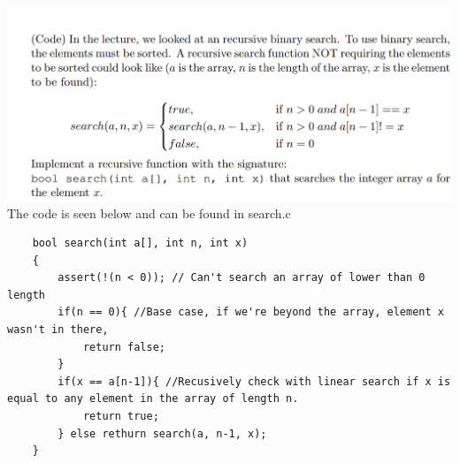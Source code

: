 \documentclass{article}
\begin{document}
\section{}
\includegraphics[width=\linewidth, keepaspectratio=true]{task3} 
The code is seen below and can be found in search.c
\begin{lstlisting}
    bool search(int a[], int n, int x)
    {
        assert(!(n < 0)); // Can't search an array of lower than 0 length
        if(n == 0){ //Base case, if we're beyond the array, element x wasn't in there,
            return false;
        }
        if(x == a[n-1]){ //Recusively check with linear search if x is equal to any element in the array of length n.
            return true;
        } else rethurn search(a, n-1, x);
    }
\end{lstlisting}
\vspace{1cm}

\pagebreak
\end{document}

